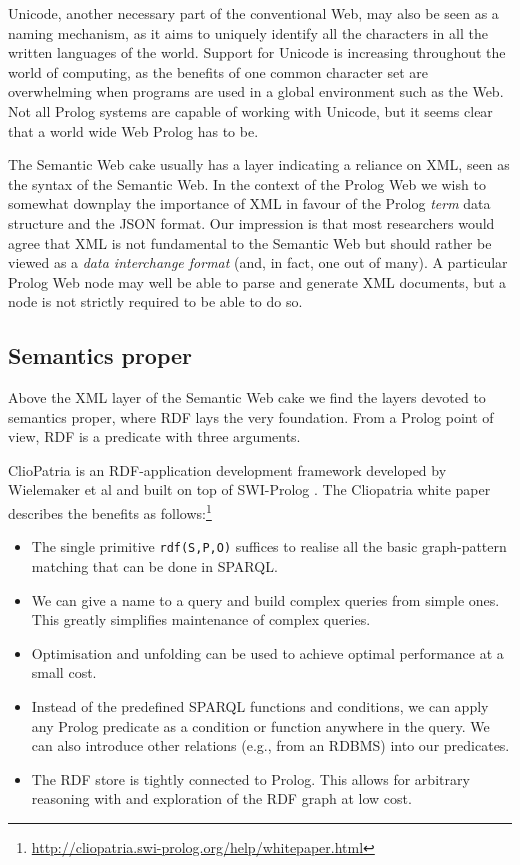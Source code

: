 \documentclass{tlp}
\begin{document}
Unicode, another necessary part of the conventional Web, may also be seen as a naming mechanism, as it aims to uniquely identify all the characters in all the written languages of the world. Support for Unicode is increasing throughout the world of computing, as the benefits of one common character set are overwhelming when programs are used in a global environment such as the Web. Not all Prolog systems are capable of working with Unicode, but it seems clear that a world wide Web Prolog has to be.

The Semantic Web cake usually has a layer indicating a reliance on XML, seen as the syntax of the Semantic Web. In the context of the Prolog Web we wish to somewhat downplay the importance of XML in favour of the Prolog \textit{term} data structure and the JSON format. Our impression is that most researchers would agree that XML is not fundamental to the Semantic Web but should rather be viewed as a \textit{data interchange format} (and, in fact, one out of many). A particular Prolog Web node may well be able to parse and generate XML documents, but a node is not strictly required to be able to do so. 


\subsection{Semantics proper}\label{sec:semantics-proper}

\noindent Above the XML layer of the Semantic Web cake we find the layers devoted to semantics proper, where RDF lays the very foundation. From a Prolog point of view, RDF is a predicate with three arguments.

ClioPatria is an RDF-application development framework developed by Wielemaker et al and built on top of SWI-Prolog \cite{wielemaker2016cliopatria}. The Cliopatria white paper describes the benefits as follows:\footnote{\url{http://cliopatria.swi-prolog.org/help/whitepaper.html}} 

\begin{itemize}

\item The single primitive \texttt{rdf(S,P,O)} suffices to realise all the basic graph-pattern matching that can be done in SPARQL.

\item We can give a name to a query and build complex queries from simple ones. This greatly simplifies maintenance of complex queries.

\item Optimisation and unfolding can be used to achieve optimal performance at a small cost.

\item Instead of the predefined SPARQL functions and conditions, we can apply any Prolog predicate as a condition or function anywhere in the query. We can also introduce other relations (e.g., from an RDBMS) into our predicates.

\item The RDF store is tightly connected to Prolog. This allows for arbitrary reasoning with and exploration of the RDF graph at low cost.

\end{itemize}
\end{document}
